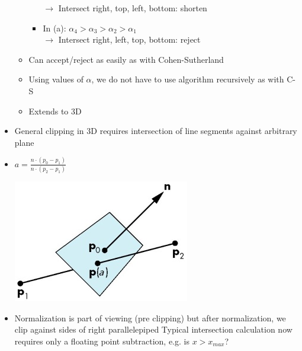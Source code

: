 \documentclass[11pt,a4paper]{article}
\begin{document}
\begin{itemize}
\begin{itemize}
\begin{itemize}
							$\rightarrow$ Intersect right, top, left, bottom: shorten 
							\item  In (a): $\alpha_4 > \alpha_3 > \alpha_2 > \alpha_1$\\
							$\rightarrow$ Intersect right, left, top, bottom: reject
						\end{itemize}
					\item Can accept/reject as easily as with Cohen-Sutherland
					\item Using values of $\alpha$, we do not have to use algorithm recursively as with C-S
					\item Extends to 3D
				\end{itemize}
			\item General clipping in 3D requires intersection of line segments against arbitrary plane
			\item $a=\frac{n\cdot (p_0-p_1)}{n\cdot (p_2-p_1)}$
			\begin{center}
				\includegraphics[scale=0.5]{pictures/PlaneLineIntersections.jpg}
			\end{center}
			\item Normalization is part of viewing (pre clipping) but after normalization, we clip against sides of right parallelepiped Typical intersection calculation now requires only a floating point subtraction, e.g. is $x > x_{max}$?
			

\end{itemize}
\end{document}
